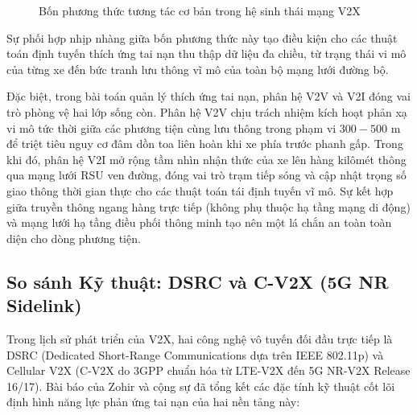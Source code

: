 \documentclass[a4paper]{article}
\begin{document}
\begin{figure}[H]
    \centering
    \caption{Bốn phương thức tương tác cơ bản trong hệ sinh thái mạng V2X}
    \label{fig:v2x_ecosystem}
\end{figure}

Sự phối hợp nhịp nhàng giữa bốn phương thức này tạo điều kiện cho các thuật toán định tuyến thích ứng tai nạn thu thập dữ liệu đa chiều, từ trạng thái vi mô của từng xe đến bức tranh lưu thông vĩ mô của toàn bộ mạng lưới đường bộ.

Đặc biệt, trong bài toán quản lý thích ứng tai nạn, phân hệ V2V và V2I đóng vai trò phòng vệ hai lớp sống còn. Phân hệ V2V chịu trách nhiệm kích hoạt phản xạ vi mô tức thời giữa các phương tiện cùng lưu thông trong phạm vi $300 - 500\text{ m}$ để triệt tiêu nguy cơ đâm dồn toa liên hoàn khi xe phía trước phanh gấp. Trong khi đó, phân hệ V2I mở rộng tầm nhìn nhận thức của xe lên hàng kilômét thông qua mạng lưới RSU ven đường, đóng vai trò trạm tiếp sóng và cập nhật trọng số giao thông thời gian thực cho các thuật toán tái định tuyến vĩ mô. Sự kết hợp giữa truyền thông ngang hàng trực tiếp (không phụ thuộc hạ tầng mạng di động) và mạng lưới hạ tầng điều phối thông minh tạo nên một lá chắn an toàn toàn diện cho dòng phương tiện.

\subsection{So sánh Kỹ thuật: DSRC và C-V2X (5G NR Sidelink)}
Trong lịch sử phát triển của V2X, hai công nghệ vô tuyến đối đầu trực tiếp là DSRC (Dedicated Short-Range Communications dựa trên IEEE 802.11p) và Cellular V2X (C-V2X do 3GPP chuẩn hóa từ LTE-V2X đến 5G NR-V2X Release 16/17). Bài báo của Zohir và cộng sự đã tổng kết các đặc tính kỹ thuật cốt lõi định hình năng lực phản ứng tai nạn của hai nền tảng này:
\end{document}
